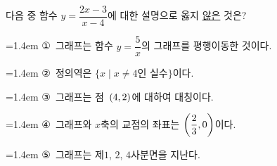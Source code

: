 다음 중 함수 $y=\dfrac{2x-3}{x-4}$에 대한 설명으로 옳지 \underline{않은} 것은?
\par\medskip\par\noindent\hangindent=1.4em {\small ①}\ 그래프는 함수 $y=\dfrac{5}{x}$의 그래프를 평행이동한 것이다.\par\noindent\hangindent=1.4em {\small ②}\ 정의역은 $\{x \mid x\ne 4$인 실수$\}$이다.\par\noindent\hangindent=1.4em {\small ③}\ 그래프는 점~$(4{,}\mkern3mu\mathopen{}2)$에 대하여 대칭이다.\par\noindent\hangindent=1.4em {\small ④}\ 그래프와 $x$축의 교점의 좌표는 $\left(\dfrac{2}{3}{,}\mkern3mu\mathopen{}0\right)$이다.\par\noindent\hangindent=1.4em {\small ⑤}\ 그래프는 제$1$, $2$, $4$사분면을 지난다.\par\medskip
